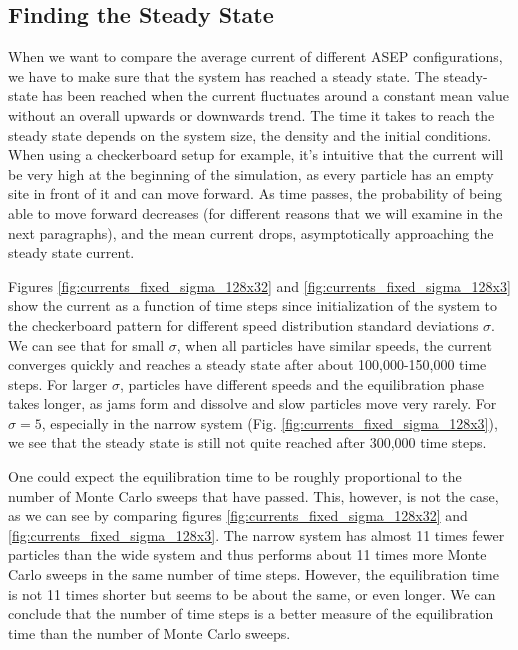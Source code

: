 \subsection{Finding the Steady State}

When we want to compare the average current of different ASEP configurations, we have to make sure that the system has reached a steady state. The steady-state has been reached when the current fluctuates around a constant mean value without an overall upwards or downwards trend. The time it takes to reach the steady state depends on the system size, the density and the initial conditions. When using a checkerboard setup for example, it's intuitive that the current will be very high at the beginning of the simulation, as every particle has an empty site in front of it and can move forward. As time passes, the probability of being able to move forward decreases (for different reasons that we will examine in the next paragraphs), and the mean current drops, asymptotically approaching the steady state current.


Figures \ref{fig:currents_fixed_sigma_128x32} and \ref{fig:currents_fixed_sigma_128x3} show the current as a function of time steps since initialization of the system to the checkerboard pattern for different speed distribution standard deviations $\sigma$. We can see that for small $\sigma$, when all particles have similar speeds, the current converges quickly and reaches a steady state after about 100,000-150,000 time steps. For larger $\sigma$, particles have different speeds and the equilibration phase takes longer, as jams form and dissolve and slow particles move very rarely. For $\sigma = 5$, especially in the narrow system (Fig. \ref{fig:currents_fixed_sigma_128x3}), we see that the steady state is still not quite reached after 300,000 time steps. 


One could expect the equilibration time to be roughly proportional to the number of Monte Carlo sweeps that have passed. This, however, is not the case, as we can see by comparing figures \ref{fig:currents_fixed_sigma_128x32} and \ref{fig:currents_fixed_sigma_128x3}. The narrow system has almost 11 times fewer particles than the wide system and thus performs about 11 times more Monte Carlo sweeps in the same number of time steps. However, the equilibration time is not 11 times shorter but seems to be about the same, or even longer. We can conclude that the number of time steps is a better measure of the equilibration time than the number of Monte Carlo sweeps.


